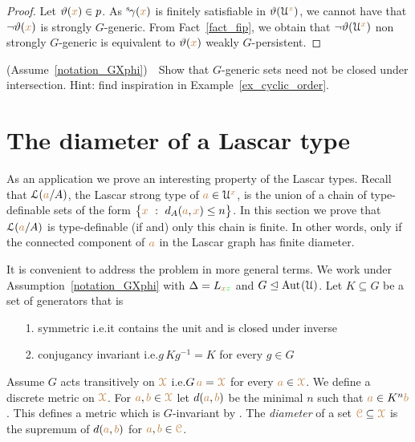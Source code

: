 \begin{proof}
  Let $\vartheta({\color{brown} x})\in p$.
  As ${}^{\rm s}\kern-.2ex\gamma({\color{brown} x})$ is finitely satisfiable in $\vartheta(\EuScript U^{\color{brown} x})$, we cannot have that $\neg\vartheta({\color{brown} x})$ is strongly $G$-generic.
  From Fact~\ref{fact_fip}, we obtain that $\neg\vartheta(\EuScript U^{\color{brown} x})$ non strongly $G$-generic is equivalent to $\vartheta({\color{brown} x})$ weakly $G$-persistent.
\end{proof}

\begin{exercise}
  (Assume~\ref{notation_GXphi})\ \  
  Show that $G$-generic sets need not be closed under intersection.
  Hint: find inspiration in Example~\ref{ex_cyclic_order}.
\end{exercise}


\section{The diameter of a Lascar type}\label{newelski}

As an application we prove an interesting property of the Lascar types.
Recall that $\EuScript L({\color{brown} a}/A)$, the Lascar strong type of ${\color{brown} a}\in\EuScript U^{\color{brown} x}$, is the union of a chain of type-definable sets of the form $\big\{{\color{brown} x}\ :\ d_A({\color{brown} a},{\color{brown} x})\le n\big\}$.
In this section we prove that $\EuScript L({\color{brown} a}/A)$ is type-definable (if and) only this chain is finite.
In other words, only if the connected component of ${\color{brown} a}$ in the Lascar graph has finite diameter.

It is convenient to address the problem in more general terms.
We work under Assumption~\ref{notation_GXphi} with $\Delta=L_{{\color{brown} x}{\color{green} z}}$ and $G\trianglelefteq{\rm Aut\kern.15ex}(\EuScript U)$.
Let $K\subseteq G$ be a set of generators that is
\begin{itemize}
  \item[1.] symmetric i.e.\@ it contains the unit and is closed under inverse
  \item[2.] conjugancy invariant i.e.\@ $g\,Kg^{-1}=K$ for every $g\in G$
\end{itemize}

Assume $G$ acts transitively on ${\color{brown}\EuScript X}$ i.e.\@ $G\,{\color{brown} a}={\color{brown}\EuScript X}$ for every ${\color{brown} a}\in{\color{brown}\EuScript X}$.
We define a discrete metric on ${\color{brown}\EuScript X}$.
For ${\color{brown} a},{\color{brown} b}\in{\color{brown}\EuScript X}$ let $d({\color{brown} a},{\color{brown} b})$ be the minimal $n$ such that ${\color{brown} a}\in K^n{\color{brown} b}$.
This defines a metric which is $G$-invariant by \ssf2.
The \emph{diameter\/} of a set ${\color{brown}\EuScript C}\subseteq{\color{brown}\EuScript X}$ is the supremum of $d({\color{brown} a},{\color{brown} b})$ for ${\color{brown} a},{\color{brown} b}\in{\color{brown}\EuScript C}$.

